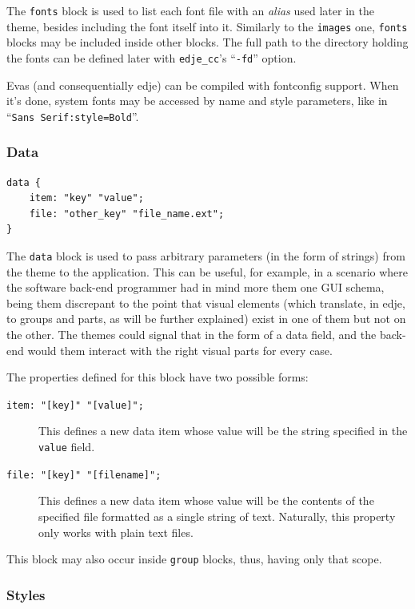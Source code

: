 \documentclass[a4paper]{profusion}
\begin{document}
The \texttt{fonts} block is used to list each font file with an
\emph{alias} used later in the theme, besides including the font
itself into it. Similarly to the \texttt{images} one, \texttt{fonts}
blocks may be included inside other blocks. The full path to the
directory holding the fonts can be defined later with
\texttt{edje\_cc}'s ``\texttt{-fd}'' option.

Evas (and consequentially edje) can be compiled with fontconfig
support.  When it's done, system fonts may be accessed by name and
style parameters, like in ``\texttt{Sans Serif:style=Bold}''.

\subsubsection{Data}

\begin{lstlisting}
data {
    item: "key" "value";
    file: "other_key" "file_name.ext";
}
\end{lstlisting}

The \texttt{data} block is used to pass arbitrary parameters (in the
form of strings) from the theme to the application.  This can be
useful, for example, in a scenario where the software back-end
programmer had in mind more them one GUI schema, being them discrepant
to the point that visual elements (which translate, in edje, to groups
and parts, as will be further explained) exist in one of them but not
on the other. The themes could signal that in the form of a data
field, and the back-end would them interact with the right visual
parts for every case.

The properties defined for this block have two possible forms:
\begin{description}
\item[\texttt{item: "[key]" "[value]";}] This defines a new data item
  whose value will be the string specified in the \texttt{value}
  field.
\item[\texttt{file: "[key]" "[filename]";}] This defines a new data
  item whose value will be the contents of the specified file formatted
  as a single string of text. Naturally, this property only works with
  plain text files.
\end{description}

This block  may also occur inside  \texttt{group} blocks, thus,
having only that scope.

\subsubsection{Styles}
\end{document}
